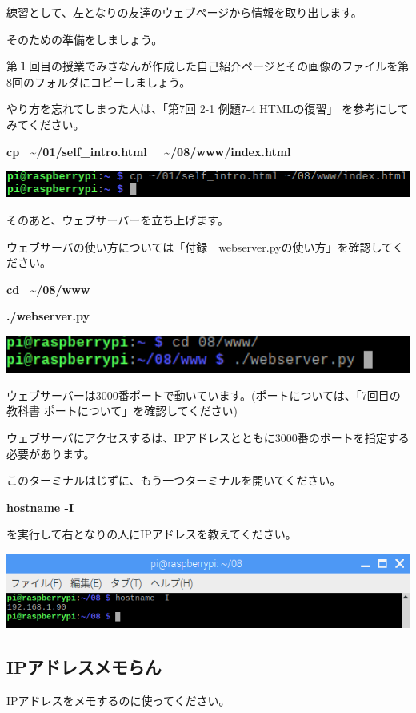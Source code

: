 \documentclass[a4paper,12pt,dvipdfmx]{jarticle}
\begin{document}
練習として、左となりの友達のウェブページから情報を取り出します。

そのための準備をしましょう。

第１回目の授業でみさなんが作成した自己紹介ページとその画像のファイルを第8回のフォルダにコピーしましょう。

やり方を忘れてしまった人は、「第7回 2-1 例題7-4 HTMLの復習」 を参考にしてみてください。

\textbf{cp \ {\textasciitilde}/01/self\_intro.html \ \ {\textasciitilde}/08/www/index.html}



\begin{center}
\includegraphics[width=17.006cm]{textbook-img002.png}

\end{center}
\clearpage
そのあと、ウェブサーバーを立ち上げます。

ウェブサーバの使い方については「付録　webserver.pyの使い方」を確認してください。

\textbf{cd \ {\textasciitilde}/08/www}

\textbf{./webserver.py}



\begin{center}
\includegraphics[width=17.006cm]{textbook-img003.png}

\end{center}
ウェブサーバーは3000番ポートで動いています。(ポートについては、「7回目の教科書
ポートについて」を確認してください)%


ウェブサーバにアクセスするは、IPアドレスとともに3000番のポートを指定する必要があります。

このターミナルはじずに、もう一つターミナルを開いてください。

\textbf{hostname -I}

を実行して右となりの人にIPアドレスを教えてください。

\begin{center}
\includegraphics[width=17.171cm]{textbook-img004.png}

\end{center}
\clearpage\subsection*{IPアドレスメモらん}
IPアドレスをメモするのに使ってください。
\end{document}
